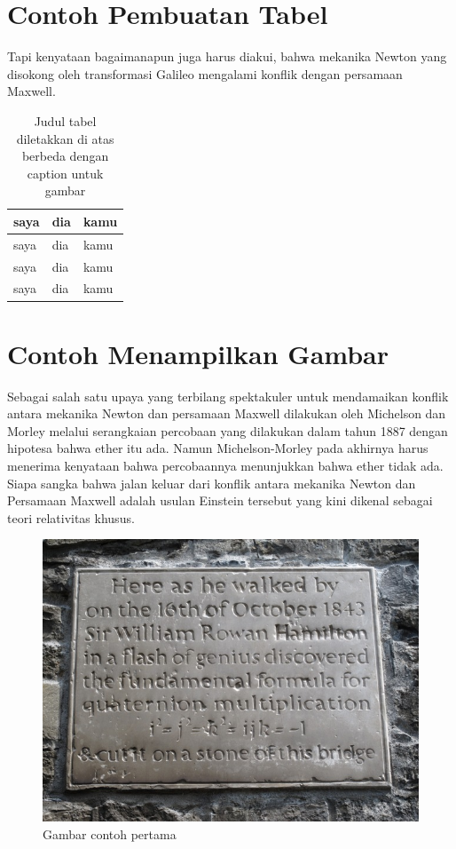 

\section{Contoh Pembuatan Tabel}

Tapi kenyataan bagaimanapun juga harus diakui, bahwa mekanika Newton yang disokong oleh transformasi Galileo mengalami konflik dengan persamaan Maxwell. 

\begin{table}[h]
\centering
\caption{Judul tabel diletakkan di atas berbeda dengan caption untuk gambar}
\label{tab:tabelpertama}
\begin{tabular}{|l|l|l|}
\hline
saya & dia & kamu \\
\hline
saya & dia & kamu \\
saya & dia & kamu \\
saya & dia & kamu \\
\hline
\end{tabular}

\end{table}

\section{Contoh Menampilkan Gambar}
Sebagai salah satu upaya yang terbilang spektakuler untuk mendamaikan konflik antara mekanika Newton dan persamaan Maxwell dilakukan oleh Michelson dan Morley melalui serangkaian percobaan yang dilakukan dalam tahun 1887 dengan hipotesa bahwa ether itu ada. Namun Michelson-Morley pada akhirnya harus menerima kenyataan bahwa percobaannya menunjukkan bahwa ether tidak ada. Siapa sangka bahwa jalan keluar dari konflik antara mekanika Newton dan Persamaan Maxwell adalah usulan Einstein tersebut yang kini dikenal sebagai teori relativitas khusus.

\begin{figure}[h]
\centering
\includegraphics[scale=0.8]{gambarcontoh.jpg}
\caption{Gambar contoh pertama}
\label{gbr:gambarpertama}
\end{figure}


